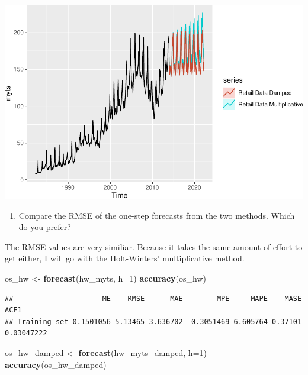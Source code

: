 \documentclass[]{article}
\newenvironment{Shaded}{\begin{snugshade}}{\end{snugshade}}
\newcommand{\KeywordTok}[1]{\textcolor[rgb]{0.13,0.29,0.53}{\textbf{#1}}}
\newcommand{\DataTypeTok}[1]{\textcolor[rgb]{0.13,0.29,0.53}{#1}}
\newcommand{\DecValTok}[1]{\textcolor[rgb]{0.00,0.00,0.81}{#1}}
\newcommand{\StringTok}[1]{\textcolor[rgb]{0.31,0.60,0.02}{#1}}
\newcommand{\NormalTok}[1]{#1}
\providecommand{\tightlist}{%
  \setlength{\itemsep}{0pt}\setlength{\parskip}{0pt}}
\begin{document}
\includegraphics{Hw4_files/figure-latex/unnamed-chunk-19-1.pdf}

\begin{enumerate}
\def\labelenumi{\alph{enumi})}
\setcounter{enumi}{2}
\tightlist
\item
  Compare the RMSE of the one-step forecasts from the two methods. Which
  do you prefer?
\end{enumerate}

The RMSE values are very similiar. Because it takes the same amount of
effort to get either, I will go with the Holt-Winters' multiplicative
method.

\begin{Shaded}
\begin{Highlighting}[]
\NormalTok{os_hw <-}\StringTok{  }\KeywordTok{forecast}\NormalTok{(hw_myts, }\DataTypeTok{h=}\DecValTok{1}\NormalTok{)}
\KeywordTok{accuracy}\NormalTok{(os_hw)}
\end{Highlighting}
\end{Shaded}

\begin{verbatim}
##                     ME    RMSE      MAE        MPE     MAPE    MASE       ACF1
## Training set 0.1501056 5.13465 3.636702 -0.3051469 6.605764 0.37101 0.03047222
\end{verbatim}

\begin{Shaded}
\begin{Highlighting}[]
\NormalTok{os_hw_damped <-}\StringTok{ }\KeywordTok{forecast}\NormalTok{(hw_myts_damped, }\DataTypeTok{h=}\DecValTok{1}\NormalTok{)}
\KeywordTok{accuracy}\NormalTok{(os_hw_damped)}
\end{Highlighting}
\end{Shaded}
\end{document}

